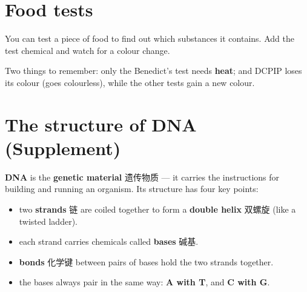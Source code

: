 \documentclass[11pt]{article}
\begin{document}
\section*{Food tests}

You can test a piece of food to find out which substances it contains. Add the test chemical and watch for a colour change.

\begin{center}
\end{center}

Two things to remember: only the Benedict's test needs \textbf{heat}; and DCPIP loses its colour (goes colourless), while the other tests gain a new colour.

\section*{The structure of DNA (Supplement)}

\textbf{DNA} is the \textbf{genetic material} 遗传物质 — it carries the instructions for building and running an organism. Its structure has four key points:

\begin{itemize}
\item two \textbf{strands} 链 are coiled together to form a \textbf{double helix} 双螺旋 (like a twisted ladder).

\item each strand carries chemicals called \textbf{bases} 碱基.

\item \textbf{bonds} 化学键 between pairs of bases hold the two strands together.

\item the bases always pair in the same way: \textbf{A with T}, and \textbf{C with G}.

\end{itemize}
\end{document}

